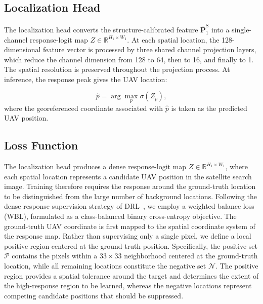 \documentclass[runningheads]{llncs}
\begin{document}
\subsection{Localization Head}

The localization head converts the structure-calibrated feature $\bar{\mathbf{P}}_{1}^{\mathrm{S}}$ into a single-channel response-logit map $Z \in \mathbb{R}^{H_1 \times W_1}$. At each spatial location, the 128-dimensional feature vector is processed by three shared channel projection layers, which reduce the channel dimension from 128 to 64, then to 16, and finally to 1. The spatial resolution is preserved throughout the projection process. At inference, the response peak gives the UAV location:

\begin{equation}
\hat{p}=\arg\max_{p}\sigma(Z_p),
\label{eq:argmax}
\end{equation}
where the georeferenced coordinate associated with $\hat{p}$ is taken as the predicted UAV position.

\subsection{Loss Function}

The localization head produces a dense response-logit map $Z\in\mathbb{R}^{H_1\times W_1}$, where each spatial location represents a candidate UAV position in the satellite search image. Training therefore requires the response around the ground-truth location to be distinguished from the large number of background locations. Following the dense response supervision strategy of DRL~\cite{dai2026drl}, we employ a weighted balance loss (WBL), formulated as a class-balanced binary cross-entropy objective. The ground-truth UAV coordinate is first mapped to the spatial coordinate
system of the response map. Rather than supervising only a single pixel,
we define a local positive region centered at the ground-truth position.
Specifically, the positive set $\mathcal{P}$ contains the pixels within a
$33\times33$ neighborhood centered at the ground-truth location, while all
remaining locations constitute the negative set $\mathcal{N}$. The positive
region provides a spatial tolerance around the target and determines the
extent of the high-response region to be learned, whereas the negative
locations represent competing candidate positions that should be suppressed.
\end{document}
